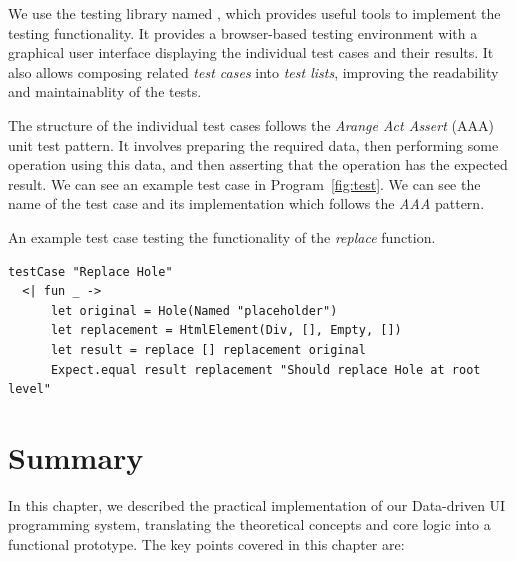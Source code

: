 We use the testing library named \citet{mocha}, which provides useful tools to implement the testing functionality.
It provides a browser-based testing environment with a graphical user interface displaying the individual test cases and their results.
It also allows composing related \emph{test cases} into \emph{test lists}, improving the readability and maintainablity of the tests.

The structure of the individual test cases follows the \emph{Arange Act Assert} (AAA) unit test pattern.
It involves preparing the required data, then performing some operation using this data, and then asserting that the operation has the expected result.
We can see an example test case in Program~\ref{fig:test}.
We can see the name of the test case and its implementation which follows the \emph{AAA} pattern.

\begin{listing}[htbp]
	\caption{An example test case testing the functionality of the \emph{replace} function.}
	\label{fig:test}
	\begin{lstlisting}
testCase "Replace Hole"
  <| fun _ ->
      let original = Hole(Named "placeholder")
      let replacement = HtmlElement(Div, [], Empty, [])
      let result = replace [] replacement original
      Expect.equal result replacement "Should replace Hole at root level"
  \end{lstlisting}
\end{listing}

\clearpage
\section{Summary}

In this chapter, we described the practical implementation of our Data-driven UI programming system,
translating the theoretical concepts and core logic into a functional prototype.
The key points covered in this chapter are:


